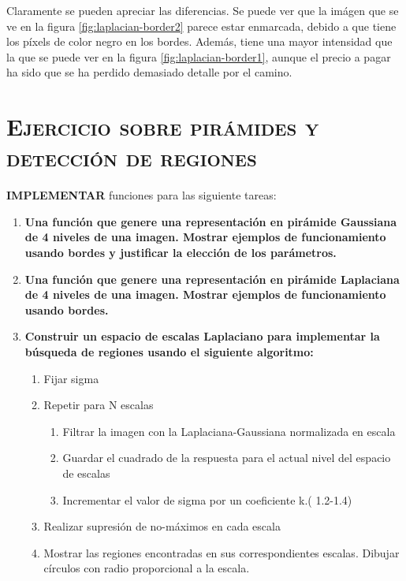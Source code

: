 \documentclass[11pt,a4paper]{article}
\begin{document}
Claramente se pueden apreciar las diferencias. Se puede ver que la imágen que se ve en la figura \ref{fig:laplacian-border2}
parece estar enmarcada, debido a que tiene los píxels de color negro en los bordes. Además, tiene una mayor intensidad que
la que se puede ver en la figura \ref{fig:laplacian-border1}, aunque el precio a pagar ha sido que se ha perdido demasiado
detalle por el camino.

\newpage

\section{\textsc{Ejercicio sobre pirámides y detección de regiones}}

\noindent \textbf{IMPLEMENTAR} funciones para las siguiente tareas:

\begin{enumerate}[label=\textbf{\Alph*)}]
	\item \textbf{Una función que genere una representación en pirámide Gaussiana de 4 niveles de una
	imagen. Mostrar ejemplos de funcionamiento usando bordes y justificar la elección de los parámetros.}
	\item \textbf{Una función que genere una representación en pirámide Laplaciana de 4 niveles de una imagen.
	Mostrar ejemplos de funcionamiento usando bordes.}
	\item \textbf{Construir un espacio de escalas Laplaciano para implementar la búsqueda de regiones usando el siguiente
	algoritmo:}
	\begin{enumerate}[label=\textbf{\alph*.}]
		\item Fijar sigma
		\item Repetir para N escalas
		\begin{enumerate}[label=\roman*.]
			\item Filtrar la imagen con la Laplaciana-Gaussiana normalizada en escala
			\item Guardar el cuadrado de la respuesta para el actual nivel del espacio de escalas
			\item Incrementar el valor de sigma por un coeficiente k.( 1.2-1.4)
		\end{enumerate}
		\item Realizar supresión de no-máximos en cada escala
		\item Mostrar las regiones encontradas en sus correspondientes escalas. Dibujar círculos con radio proporcional a
		la escala.
	\end{enumerate}
\end{enumerate}
\end{document}
